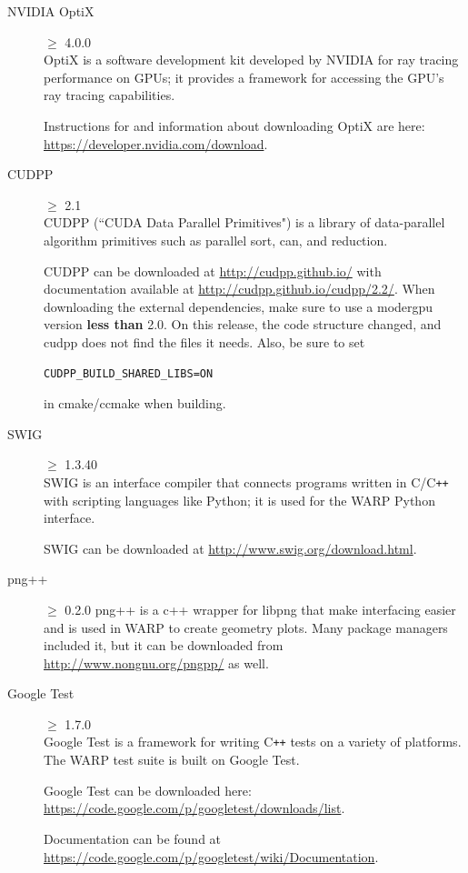 \documentclass[twoside,a4paper]{refart}
\begin{document}
\begin{description}
\item[NVIDIA OptiX]$\ge$ 4.0.0 \\
OptiX is a software development kit developed by NVIDIA for ray tracing performance on GPUs; it provides a
framework for accessing the GPU's ray tracing capabilities.

Instructions for and information about downloading OptiX are here: \url{https://developer.nvidia.com/download}.

\item[CUDPP]$\ge$ 2.1 \\
CUDPP (``CUDA Data Parallel Primitives") is a library of data-parallel algorithm primitives such as 
parallel sort, can, and reduction.

CUDPP can be downloaded at \url{http://cudpp.github.io/} with documentation available at 
\url{http://cudpp.github.io/cudpp/2.2/}.  When downloading the external dependencies, make sure to use a modergpu version {\bf less than} 2.0.  On this release, the code structure changed, and cudpp does not find the files it needs.  Also, be sure to set \begin{verbatim}CUDPP_BUILD_SHARED_LIBS=ON\end{verbatim} in cmake/ccmake when building.

\item[SWIG]$\ge$ 1.3.40 \\
SWIG is an interface compiler that connects programs written in C/C\texttt{++} with scripting languages
like Python; it is used for the WARP Python interface.

SWIG can be downloaded at \url{http://www.swig.org/download.html}.

\item[png++] $\ge$ 0.2.0
png++ is a c++ wrapper for libpng that make interfacing easier and is used in WARP to create geometry plots. Many package managers included it, but it can be downloaded from \url{http://www.nongnu.org/pngpp/} as well.

\item[Google Test]$\ge$ 1.7.0 \\
Google Test is a framework for writing C\texttt{++} tests on a variety of platforms. The WARP test suite
is built on Google Test.

Google Test can be downloaded here: \url{https://code.google.com/p/googletest/downloads/list}.

Documentation can be found at \url{https://code.google.com/p/googletest/wiki/Documentation}.


\end{description}
\end{document}
